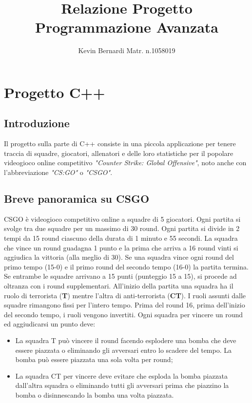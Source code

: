 \documentclass[a4paper, 11pt]{article}
\title{Relazione Progetto Programmazione Avanzata}
\author{Kevin Bernardi Matr. n.1058019}
\date{}
\begin{document}
\maketitle
\section{Progetto C++}
\subsection{Introduzione}
Il progetto sulla parte di C++ consiste in una piccola applicazione per tenere traccia di squadre, giocatori, allenatori e delle loro statistiche per il popolare videogioco online competitivo \textit{"Counter Strike: Global Offensive"}, noto anche con l'abbreviazione \textit{"CS:GO"} o \textit{"CSGO"}.

\subsection{Breve panoramica su CSGO}
CSGO è videogioco competitivo online a squadre di 5 giocatori. Ogni partita si svolge tra due squadre per un massimo di 30 round. 
Ogni partita si divide in 2 tempi da 15 round ciascuno della durata di 1 minuto e 55 secondi.
La squadra che vince un round guadagna 1 punto e la prima che arriva a 16 round vinti si aggiudica la vittoria (alla meglio di 30). Se una squadra vince ogni round del primo tempo (15-0) e il primo round del secondo tempo (16-0) la partita termina. Se entrambe le squadre arrivano a 15 punti (punteggio 15 a 15), si procede ad oltranza con i round supplementari.
All'inizio della partita una squadra ha il ruolo di terrorista (\textbf{T}) mentre l'altra di anti-terrorista (\textbf{CT}). I ruoli assunti dalle squadre rimangono fissi per l'intero tempo. Prima del round 16, prima dell'inizio del secondo tempo, i ruoli vengono invertiti.
Ogni squadra per vincere un round ed aggiudicarsi un punto deve:
\begin{itemize}
\item La squadra T può vincere il round facendo esplodere una bomba che deve essere piazzata o eliminando gli avversari entro lo scadere del tempo. La bomba può essere piazzata una sola volta per round;

\item La squadra CT per vincere deve evitare che esploda la bomba piazzata dall'altra squadra o eliminando tutti gli avversari prima che piazzino la bomba o disinnescando la bomba una volta piazzata.
\end{itemize}
\end{document}
